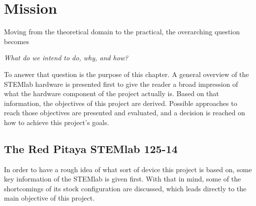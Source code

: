 %
%
\chapter{Mission} %
\label{ch:mission}
%
%

Moving from the theoretical domain  to the practical, the overarching question
becomes
\begin{center}
    \emph{What do  we intend to do, why, and how?}
\end{center}
To answer that question is the  purpose of this chapter. A general overview of
the STEMlab hardware is presented first  to give the reader a broad impression
of what  the hardware  component of  the project actually  is.  Based  on that
information, the  objectives of this project  are derived. Possible approaches
to  reach those  objectives are  presented and  evaluated, and  a decision  is
reached on how to achieve this project's goals.

%
%
\section{The Red Pitaya STEMlab 125-14} %
\label{sec:stl125}

In order to have a rough idea of what sort of device this project is based on,
some key information of the STEMlab is given first. With that in mind, some of
the  shortcomings  of  its  stock configuration  are  discussed,  which  leads
directly to the main objective of this project.

%
%
